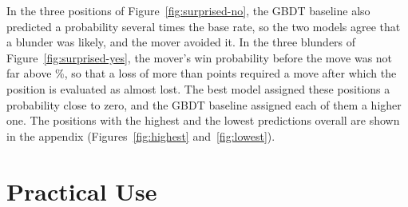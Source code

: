 \documentclass[11pt]{article}
\begin{document}
In the three positions of Figure~\ref{fig:surprised-no}, the GBDT baseline
also predicted a probability several times the base rate, so the two models
agree that a blunder was likely, and the mover avoided it. In the three
blunders of Figure~\ref{fig:surprised-yes}, the mover's win probability
before the move was not far above \%, so that a loss of
more than  points required a move after which the
position is evaluated as almost lost. The best model assigned these positions
a probability close to zero, and the GBDT baseline assigned each of them a
higher one. The positions with the highest and the lowest predictions overall
are shown in the appendix (Figures~\ref{fig:highest} and~\ref{fig:lowest}).



\fi

\section{Practical Use}
\label{sec:use}
\end{document}
